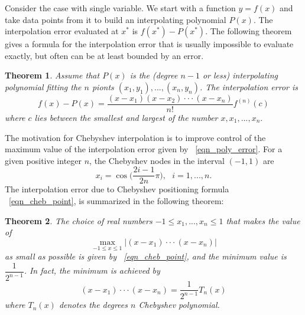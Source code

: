 \documentclass[11pt]{amsart}
\newtheorem{theorem}{Theorem}%
\theoremstyle{definition}
\begin{document}
Consider the case with single variable. We start with a function $y=f(x)$ and take data points from it to build an interpolating polynomial $P(x)$. The interpolation error evaluated at $x^*$ is $f(x^*)-P(x^*)$. The following theorem gives a formula for the interpolation error that is usually impossible to evaluate exactly, but often can be at least bounded by an error.
\begin{theorem}
Assume that $P(x)$ is the (degree $n-1$ or less) interpolating polynomial fitting the $n$ pionts $(x_1,y_1),...,(x_n,y_n)$. The interpolation error is 
\begin{equation} \label{eqn_poly_error}
f(x)-P(x)=\frac{(x-x_1)(x-x_2)\cdot\cdot\cdot(x-x_n)}{n!}f^{(n)}(c)
\end{equation}
where $c$ lies between the smallest and largest of the number $x,x_1,...,x_n.$
\end{theorem}
The motivation for Chebyshev interpolation is to improve control of the maximum value of the interpolation error given by ~\eqref{eqn_poly_error}. For a given positive integer $n$, the Chebyshev nodes in the interval $(-1,1)$ are
\begin{equation}
\label{eqn_cheb_point}
x_i=\cos\Big(\frac{2i-1}{2n}\pi\Big),\mbox{ }i=1,...,n.
\end{equation}
The interpolation error due to Chebyshev positioning formula ~\eqref{eqn_cheb_point}, is summarized in the following theorem:
\begin{theorem}
The choice of real numbers $-1\le x_1,...,x_n\le 1$ that makes the value of 
\begin{equation}
\max_{-1 \leq x \leq 1}|(x-x_1)\cdot\cdot\cdot(x-x_n)|
\end{equation}
as small as possible is given by ~\eqref{eqn_cheb_point}, and the minimum value is $\dfrac{1}{2^{n-1}}$. In fact, the minimum is achieved by 
\begin{equation} \label{eqn_cheb_error}
(x-x_1)\cdot\cdot\cdot(x-x_n)=\frac{1}{2^{n-1}}T_n(x)
\end{equation}
where $T_n(x)$ denotes the degrees $n$ Chebyshev polynomial.
\end{theorem}
\end{document}
